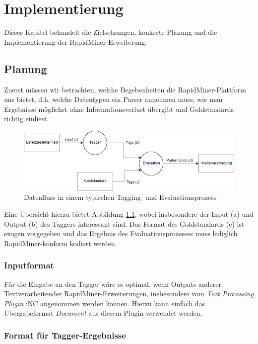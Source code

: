 %
\chapter{Implementierung}
\label{sec:impl}

Dieses Kapitel behandelt die  Zielsetzungen, konkrete Planung und die Implementierung der RapidMiner-Erweiterung.

\section{Planung}
\label{sec:impl:plan}
Zuerst müssen wir betrachten, welche Begebenheiten die RapidMiner-Plattform uns bietet, d.h. welche Datentypen ein Parser annehmen muss, wie man Ergebnisse möglichst ohne Informationsverlust übergibt und Goldstandards richtig einliest.

\begin{figure}[htb]
	\includegraphics[width=\textwidth]{gfx/Dataflow.jpg}
	\caption{Datenfluss in einem typischen Tagging- und Evaluationsprozess}
	\label{fig:impl:plan:dataflow}
\end{figure}

Eine Übersicht hierzu bietet Abbildung \ref{fig:impl:plan:dataflow}, wobei insbesondere der Input (a) und Output (b) des Taggers interessant sind. Das Format des Goldstandards (c) ist exogen vorgegeben und das Ergebnis des Evaluationsprozesses muss lediglich RapidMiner-konform kodiert werden.

\subsection{Inputformat}
\label{sec:impl:plan:input}

Für die Eingabe an den Tagger wäre es optimal, wenn Outputs anderer Textverarbeitender RapidMiner-Erweiterungen, insbesondere vom \textit{Text Processing Plugin} :NC angenommen werden können. Hierzu kann einfach das Übergabeformat \textit{Document} aus diesem Plugin verwendet werden.

\subsection{Format für Tagger-Ergebnisse}
\label{sec:impl:plan:thru}

